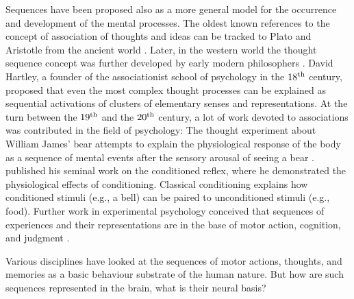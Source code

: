   Sequences have been proposed also as a more general model for the occurrence
  and development of the mental processes. The oldest known references to the
  concept of association of thoughts and ideas can be tracked to Plato and
  Aristotle from the ancient world \citep{Plato:Phaedo, Bloch2007}. Later, in
  the western world the thought sequence concept was further developed by early
  modern philosophers \citep{Hobbes, Locke, Hume, Hume2, Stewart}. David
  Hartley, a founder of the associationist school of psychology in the $18^{\rm
  th}$ century, proposed that even the most complex thought processes can be
  explained as sequential activations of clusters of elementary senses and
  representations. At the turn between the $19^{\rm th}$ and the $20^{\rm th}$
  century, a lot of work devoted to associations was contributed in the field
  of psychology: The thought experiment about William James' bear attempts to
  explain the physiological response of the body as a sequence of mental events
  after the sensory arousal of seeing a bear \citep{James1884}.
  \cite{Pavlov1897} published his seminal work on the conditioned reflex, where
  he demonstrated the physiological effects of conditioning. Classical
  conditioning explains how conditioned stimuli (e.g., a bell) can be paired to
  unconditioned stimuli (e.g., food). Further work in experimental psychology
  conceived that sequences of experiences and their representations are in the
  base of motor action, cognition, and judgment \citep{Watt1904, Titchener1905,
  Washburn1916}.

  Various disciplines have looked at the sequences of motor actions, thoughts,
  and memories as a basic behaviour substrate of the human nature. But how are
  such sequences represented in the brain, what is their neural basis?



